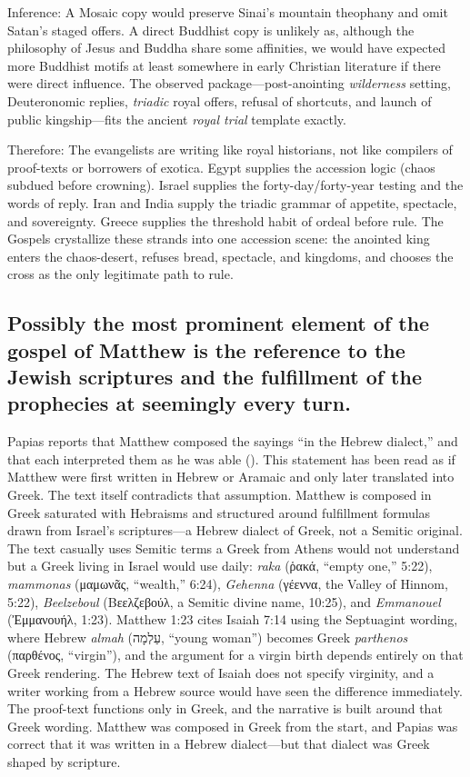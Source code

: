 Inference:
A Mosaic copy would preserve Sinai’s mountain theophany and omit Satan’s staged offers.
A direct Buddhist copy is unlikely as, although the philosophy of Jesus and Buddha share some affinities, we would have expected more Buddhist motifs at least somewhere in early Christian literature if there were direct influence.
The observed package---post-anointing \emph{wilderness} setting, Deuteronomic replies, \emph{triadic} royal offers, refusal of shortcuts, and launch of public kingship---fits the ancient \emph{royal trial} template exactly.

Therefore:
The evangelists are writing like royal historians, not like compilers of proof-texts or borrowers of exotica.
Egypt supplies the accession logic (chaos subdued before crowning).
Israel supplies the forty-day/forty-year testing and the words of reply.
Iran and India supply the triadic grammar of appetite, spectacle, and sovereignty.
Greece supplies the threshold habit of ordeal before rule.
The Gospels crystallize these strands into one accession scene: the anointed king enters the chaos-desert, refuses bread, spectacle, and kingdoms, and chooses the cross as the only legitimate path to rule.

\subsection{Possibly the most prominent element of the gospel of Matthew is the reference to the Jewish scriptures and the fulfillment of the prophecies at seemingly every turn.}\label{subsec:possibly-the-most-prominent-element-of-the-gospel-of-matthew-is-the-reference-to-the-jewish-scriptures-and-the-fulfillment-of-the-prophecies-at-seemingly-every-turn.}

Papias reports that Matthew composed the sayings ``in the Hebrew dialect,'' and that each interpreted them as he was able (\cite[3.39]{eusebius:he}).
This statement has been read as if Matthew were first written in Hebrew or Aramaic and only later translated into Greek.
The text itself contradicts that assumption.
Matthew is composed in Greek saturated with Hebraisms and structured around fulfillment formulas drawn from Israel's scriptures---a Hebrew dialect of Greek, not a Semitic original.
The text casually uses Semitic terms a Greek from Athens would not understand but a Greek living in Israel would use daily: \emph{raka} (ῥακά, ``empty one,'' 5:22), \emph{mammonas} (μαμωνᾶς, ``wealth,'' 6:24), \emph{Gehenna} (γέεννα, the Valley of Hinnom, 5:22), \emph{Beelzeboul} (Βεελζεβούλ, a Semitic divine name, 10:25), and \emph{Emmanouel} (Ἐμμανουήλ, 1:23).
Matthew 1:23 cites Isaiah 7:14 using the Septuagint wording, where Hebrew \emph{almah} (עַלְמָה, ``young woman'') becomes Greek \emph{parthenos} (παρθένος, ``virgin''), and the argument for a virgin birth depends entirely on that Greek rendering.
The Hebrew text of Isaiah does not specify virginity, and a writer working from a Hebrew source would have seen the difference immediately.
The proof-text functions only in Greek, and the narrative is built around that Greek wording.
Matthew was composed in Greek from the start, and Papias was correct that it was written in a Hebrew dialect---but that dialect was Greek shaped by scripture.

